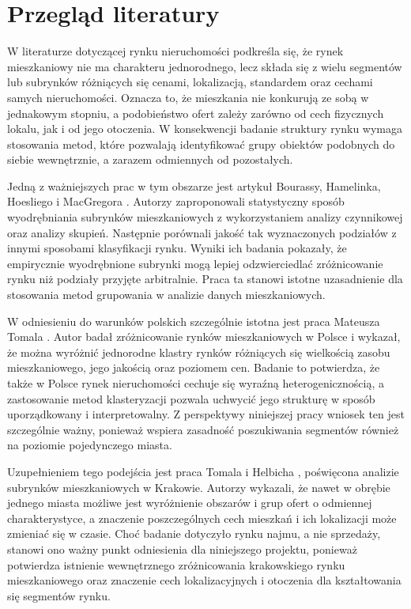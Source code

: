 \documentclass{report}
\begin{document}
\section{Przegląd literatury}


W literaturze dotyczącej rynku nieruchomości podkreśla się, że rynek mieszkaniowy nie ma charakteru jednorodnego, lecz składa się z wielu segmentów lub subrynków różniących się cenami, lokalizacją, standardem oraz cechami samych nieruchomości. Oznacza to, że mieszkania nie konkurują ze sobą w jednakowym stopniu, a podobieństwo ofert zależy zarówno od cech fizycznych lokalu, jak i od jego otoczenia. W konsekwencji badanie struktury rynku wymaga stosowania metod, które pozwalają identyfikować grupy obiektów podobnych do siebie wewnętrznie, a zarazem odmiennych od pozostałych.

Jedną z ważniejszych prac w tym obszarze jest artykuł Bourassy, Hamelinka, Hoesliego i MacGregora \cite{bourassa1999}. Autorzy zaproponowali statystyczny sposób wyodrębniania subrynków mieszkaniowych z wykorzystaniem analizy czynnikowej oraz analizy skupień. Następnie porównali jakość tak wyznaczonych podziałów z innymi sposobami klasyfikacji rynku. Wyniki ich badania pokazały, że empirycznie wyodrębnione subrynki mogą lepiej odzwierciedlać zróżnicowanie rynku niż podziały przyjęte arbitralnie. Praca ta stanowi istotne uzasadnienie dla stosowania metod grupowania w analizie danych mieszkaniowych.

W odniesieniu do warunków polskich szczególnie istotna jest praca Mateusza Tomala \cite{tomal2021}. Autor badał zróżnicowanie rynków mieszkaniowych w Polsce i wykazał, że można wyróżnić jednorodne klastry rynków różniących się wielkością zasobu mieszkaniowego, jego jakością oraz poziomem cen. Badanie to potwierdza, że także w Polsce rynek nieruchomości cechuje się wyraźną heterogenicznością, a zastosowanie metod klasteryzacji pozwala uchwycić jego strukturę w sposób uporządkowany i interpretowalny. Z perspektywy niniejszej pracy wniosek ten jest szczególnie ważny, ponieważ wspiera zasadność poszukiwania segmentów również na poziomie pojedynczego miasta.

Uzupełnieniem tego podejścia jest praca Tomala i Helbicha \cite{tomalhelbich2022}, poświęcona analizie subrynków mieszkaniowych w Krakowie. Autorzy wykazali, że nawet w obrębie jednego miasta możliwe jest wyróżnienie obszarów i grup ofert o odmiennej charakterystyce, a znaczenie poszczególnych cech mieszkań i ich lokalizacji może zmieniać się w czasie. Choć badanie dotyczyło rynku najmu, a nie sprzedaży, stanowi ono ważny punkt odniesienia dla niniejszego projektu, ponieważ potwierdza istnienie wewnętrznego zróżnicowania krakowskiego rynku mieszkaniowego oraz znaczenie cech lokalizacyjnych i otoczenia dla kształtowania się segmentów rynku.
\end{document}
